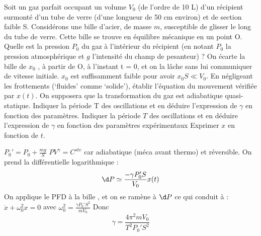 \begin{Exercise}[title=Méthode de Rückhardt]
	Soit un gaz parfait occupant un volume $V_0$ (de l’ordre de 10 L) d’un récipient surmonté d’un tube de verre (d’une longueur de 50 cm environ) et de section faible S.
	Considérons une bille d’acier, de masse $m$, susceptible de glisser le long du tube de verre.
	Cette bille se trouve en équilibre mécanique en un point O.
	\Question Quelle est la pression $P_{0}$ du gaz à l’intérieur du récipient (en notant $P_0$ la pression atmosphérique et $g$ l’intensité du champ de pesanteur) ?
	\Question On écarte la bille de $x_0$ , à partir de O, à l’instant t = 0, et on la lâche sans lui communiquer de vitesse initiale. $x_0$ est suffisamment faible pour avoir $x_0S \ll V_0$.
	\subQuestion En négligeant les frottements (‘fluides’ comme ‘solide’), établir l’équation du mouvement
	vérifiée par $x(t)$. On supposera que la transformation du gaz est adiabatique quasi-statique. Indiquer la période T des oscillations et en déduire l’expression de $\gamma$ en fonction des paramètres.
	\subQuestion Indiquer la période $T$ des oscillations et en déduire l’expression de $\gamma$ en fonction des paramètres expérimentaux
	\subQuestion Exprimer $x$ en fonction de $t$.
\end{Exercise}
\begin{Answer}
	\Question $P_0'  = P_0 + \frac{mg}{S}$
	\Question $PV^\gamma = C^{ste}$ car adiabatique (méca avant thermo) et réversible. On prend la différentielle logarithmique :
	\[\d P \simeq \frac{-\gamma P_0' S}{V_0}x(t)\]
	On applique le PFD à la bille , et on se ramène à $\d P$ ce qui conduit à : $\ddot{x} +\omega_0^2 x = 0$ avec $\omega_0^2 = \frac{\gamma P_0' S^2}{mV_0}$
	Donc \[\gamma = \frac{4\pi^2 mV_0}{T^2P_0'S^2}\]
\end{Answer}
